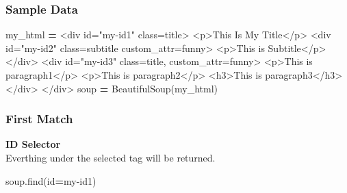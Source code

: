 \documentclass[
]{book}
\newenvironment{Shaded}{\begin{snugshade}}{\end{snugshade}}
\newcommand{\BuiltInTok}[1]{#1}
\newcommand{\NormalTok}[1]{#1}
\newcommand{\OperatorTok}[1]{\textcolor[rgb]{0.43,0.43,0.43}{\textbf{#1}}}
\newcommand{\StringTok}[1]{\textcolor[rgb]{0.5,0.5,0.5}{#1}}
\begin{document}
\hypertarget{sample-data-26}{%
\subsubsection{Sample Data}\label{sample-data-26}}

\begin{Shaded}
\begin{Highlighting}[]
\NormalTok{my\_html }\OperatorTok{=} \StringTok{\textquotesingle{}\textquotesingle{}\textquotesingle{}}
\StringTok{\textless{}div id="my{-}id1" class=\textquotesingle{}title\textquotesingle{}\textgreater{} }
\StringTok{    \textless{}p\textgreater{}This Is My Title\textless{}/p\textgreater{}}
\StringTok{    }
\StringTok{    \textless{}div id="my{-}id2" class=\textquotesingle{}subtitle\textquotesingle{} custom\_attr=\textquotesingle{}funny\textquotesingle{}\textgreater{}}
\StringTok{        \textless{}p\textgreater{}This is Subtitle\textless{}/p\textgreater{}}
\StringTok{    \textless{}/div\textgreater{}}
\StringTok{    }
\StringTok{    \textless{}div id="my{-}id3" class=\textquotesingle{}title\textquotesingle{},   custom\_attr=\textquotesingle{}funny\textquotesingle{}\textgreater{}}
\StringTok{        \textless{}p\textgreater{}This is paragraph1\textless{}/p\textgreater{}}
\StringTok{        \textless{}p\textgreater{}This is paragraph2\textless{}/p\textgreater{}}
\StringTok{        \textless{}h3\textgreater{}This is paragraph3\textless{}/h3\textgreater{}}
\StringTok{    \textless{}/div\textgreater{}}
\StringTok{\textless{}/div\textgreater{}}
\StringTok{\textquotesingle{}\textquotesingle{}\textquotesingle{}}
\NormalTok{soup }\OperatorTok{=}\NormalTok{ BeautifulSoup(my\_html)}
\end{Highlighting}
\end{Shaded}

\hypertarget{first-match}{%
\subsubsection{First Match}\label{first-match}}

\textbf{ID Selector}\\
Everthing under the selected tag will be returned.

\begin{Shaded}
\begin{Highlighting}[]
\NormalTok{soup.find(}\BuiltInTok{id}\OperatorTok{=}\StringTok{\textquotesingle{}my{-}id1\textquotesingle{}}\NormalTok{)}
\end{Highlighting}
\end{Shaded}
\end{document}
